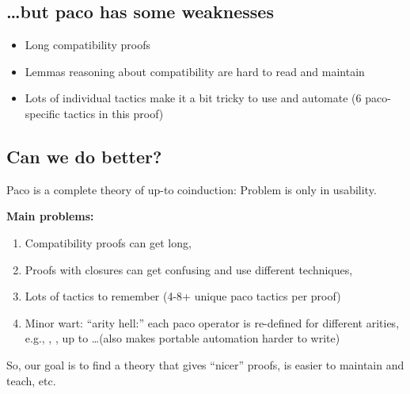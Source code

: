 \subsection{\ldots but paco has some weaknesses}

\begin{itemize}
  \item Long compatibility proofs
  \item Lemmas reasoning about compatibility are hard to read and maintain
  \item Lots of individual tactics make it a bit tricky to use and automate
        (6 paco-specific tactics in this proof)
\end{itemize}


\subsection{Can we do better?}

Paco is a complete theory of up-to coinduction: Problem is only in usability.

\textbf{Main problems:}
\begin{enumerate}
  \item Compatibility proofs can get long,
  \item Proofs with  closures can get confusing and use different
        techniques,
  \item Lots of tactics to remember (4-8+ unique paco tactics per proof)
  \item Minor wart: ``arity hell:'' each paco operator is re-defined for
        different arities, e.g., , , up to
        \ldots (also makes portable automation harder to write)
\end{enumerate}

So, our goal is to find a theory that gives ``nicer'' proofs, is easier to
maintain and teach, etc.
